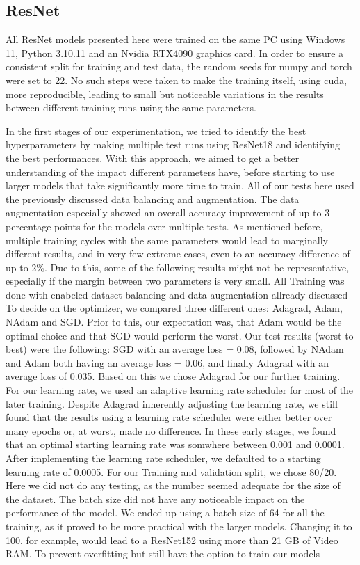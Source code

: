 \subsection{ResNet}\label{resultsReNet}

\label{setup}
All ResNet models presented here were trained on the same PC using Windows 11, Python 3.10.11 and an Nvidia RTX4090 graphics card. In order to ensure a consistent split for training and test data, the random seeds for numpy and torch were set to 22. No such steps were taken to make the training itself, using cuda, more reproducible, leading to small but noticeable variations in the results between different training runs using the same parameters.

\label{Hyperparameters}
In the first stages of our experimentation, we tried to identify the best hyperparameters by making multiple test runs using ResNet18 and identifying the best performances. With this approach, we aimed to get a better understanding of the impact different parameters have, before starting to use larger models that take significantly more time to train. All of our tests here used the previously discussed data balancing and augmentation. The data augmentation especially showed an overall accuracy improvement of up to 3 percentage points for the models over multiple tests. As mentioned before, multiple training cycles with the same parameters would lead to marginally different results, and in very few extreme cases, even to an accuracy difference of up to 2\%. Due to this, some of the following results might not be representative, especially if the margin between two parameters is very small. All Training was done with enabeled dataset balancing and data-augmentation allready discussed To decide on the optimizer, we compared three different ones: Adagrad, Adam, NAdam and SGD\@. Prior to this, our expectation was, that Adam would be the optimal choice and that SGD would perform the worst. Our test results (worst to best) were the following: SGD with an average loss = 0.08, followed by NAdam and Adam both having an average loss = 0.06, and finally Adagrad with an average loss of 0.035. Based on this we chose Adagrad for our further training. For our learning rate, we used an adaptive learning rate scheduler for most of the later training. Despite Adagrad inherently adjusting the learning rate, we still found that the results using a learning rate scheduler were either better over many epochs or, at worst, made no difference. In these early stages, we found that an optimal starting learning rate was somwhere between 0.001 and 0.0001. After implementing the learning rate scheduler, we defaulted to a starting learning rate of 0.0005. For our Training and validation split, we chose 80/20. Here we did not do any testing, as the number seemed adequate for the size of the dataset. The batch size did not have any noticeable impact on the performance of the model. We ended up using a batch size of 64 for all the training, as it proved to be more practical with the larger models. Changing it to 100, for example, would lead to a ResNet152 using more than 21 GB of Video RAM\@. To prevent overfitting but still have the option to train our models 